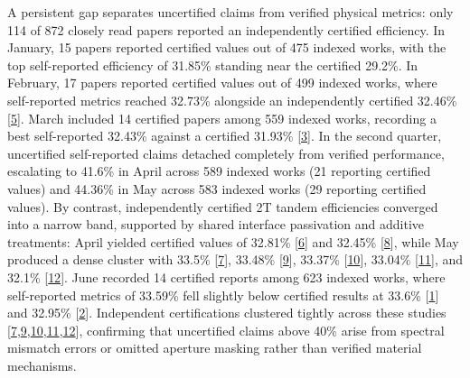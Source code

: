 \documentclass[
  11pt,
]{article}
\begin{document}
A persistent gap separates uncertified claims from verified physical
metrics: only 114 of 872 closely read papers reported an independently
certified efficiency. In January, 15 papers reported certified values
out of 475 indexed works, with the top self-reported efficiency of
31.85\% standing near the certified 29.2\%. In February, 17 papers
reported certified values out of 499 indexed works, where self-reported
metrics reached 32.73\% alongside an independently certified 32.46\%
{[}\href{https://doi.org/10.1021/acsenergylett.5c04127}{5}{]}. March
included 14 certified papers among 559 indexed works, recording a best
self-reported 32.43\% against a certified 31.93\%
{[}\href{https://doi.org/10.1016/j.esci.2026.100563}{3}{]}. In the
second quarter, uncertified self-reported claims detached completely
from verified performance, escalating to 41.6\% in April across 589
indexed works (21 reporting certified values) and 44.36\% in May across
583 indexed works (29 reporting certified values). By contrast,
independently certified 2T tandem efficiencies converged into a narrow
band, supported by shared interface passivation and additive treatments:
April yielded certified values of 32.81\%
{[}\href{https://doi.org/10.1002/adma.73106}{6}{]} and 32.45\%
{[}\href{https://doi.org/10.1038/s41467-026-72160-x}{8}{]}, while May
produced a dense cluster with 33.5\%
{[}\href{https://doi.org/10.1038/s41467-026-72794-x}{7}{]}, 33.48\%
{[}\href{https://doi.org/10.1126/sciadv.aec4431}{9}{]}, 33.37\%
{[}\href{https://doi.org/10.1002/aenm.71107}{10}{]}, 33.04\%
{[}\href{https://doi.org/10.1038/s41467-026-73656-2}{11}{]}, and 32.1\%
{[}\href{https://doi.org/10.1002/anie.5162616}{12}{]}. June recorded 14
certified reports among 623 indexed works, where self-reported metrics
of 33.59\% fell slightly below certified results at 33.6\%
{[}\href{https://doi.org/10.1126/science.aef5355}{1}{]} and 32.95\%
{[}\href{https://doi.org/10.1038/s41467-026-73276-w}{2}{]}. Independent
certifications clustered tightly across these studies
{[}\href{https://doi.org/10.1038/s41467-026-72794-x}{7},\href{https://doi.org/10.1126/sciadv.aec4431}{9},\href{https://doi.org/10.1002/aenm.71107}{10},\href{https://doi.org/10.1038/s41467-026-73656-2}{11},\href{https://doi.org/10.1002/anie.5162616}{12}{]},
confirming that uncertified claims above 40\% arise from spectral
mismatch errors or omitted aperture masking rather than verified
material mechanisms.
\end{document}
